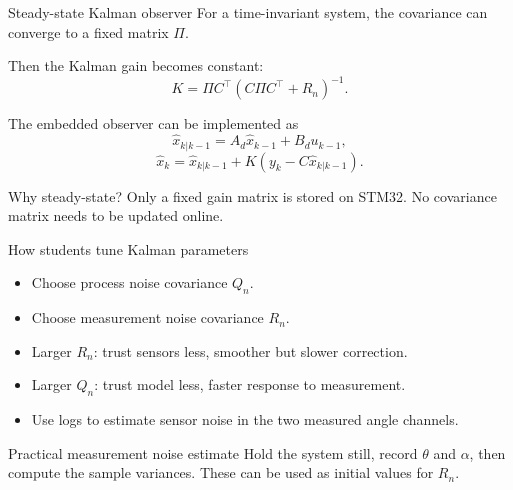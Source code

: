 \documentclass[aspectratio=169]{beamer}
\begin{document}
\begin{frame}{Steady-state Kalman observer}
For a time-invariant system, the covariance can converge to a fixed matrix \(\Pi\).

\vspace{0.15cm}
Then the Kalman gain becomes constant:
\[
K=\Pi C^\top(C\Pi C^\top+R_n)^{-1}.
\]

\vspace{0.15cm}
The embedded observer can be implemented as
\[
\hat{x}_{k|k-1}=A_d\hat{x}_{k-1}+B_du_{k-1},
\]
\[
\hat{x}_{k}=\hat{x}_{k|k-1}+K(y_k-C\hat{x}_{k|k-1}).
\]

\vspace{0.15cm}
\begin{block}{Why steady-state?}
\small
Only a fixed gain matrix is stored on STM32. No covariance matrix needs to be updated online.
\end{block}
\end{frame}

\begin{frame}{How students tune Kalman parameters}
\begin{itemize}
    \item Choose process noise covariance \(Q_n\).
    \vspace{0.2cm}
    \item Choose measurement noise covariance \(R_n\).
    \vspace{0.2cm}
    \item Larger \(R_n\): trust sensors less, smoother but slower correction.
    \vspace{0.2cm}
    \item Larger \(Q_n\): trust model less, faster response to measurement.
    \vspace{0.2cm}
    \item Use logs to estimate sensor noise in the two measured angle channels.
\end{itemize}

\vspace{0.15cm}
\begin{block}{Practical measurement noise estimate}
\small
Hold the system still, record \(\theta\) and \(\alpha\), then compute the sample variances. These can be used as initial values for \(R_n\).
\end{block}
\end{frame}
\end{document}
